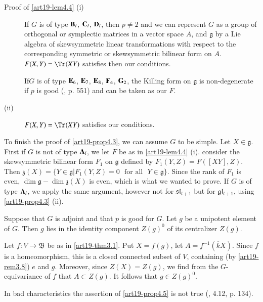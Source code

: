 \begin{description}
\item[Proof of \ref{art19-lem4.4} {\rm (i)}]
If $G$ is of type $\mathbf{B}_{l}$, $\mathbf{C}_{l}$, $\mathbf{D}_{l}$, then $p\neq 2$ and we can represent $G$ as a group of orthogonal or symplectic matrices in a vector space $A$, and $\mathfrak{g}$ by a Lie algebra of skewsymmetric linear transformations with respect to the corresponding symmetric or skewsymmetric bilinear form on $A$. $F(X,Y)=\Tr(XY)$ satisfies then our conditions.

If\pageoriginale $G$ is of type $\mathbf{E}_{6}$, $\mathbf{E}_{7}$, $\mathbf{E}_{8}$, $\mathbf{F}_{4}$, $\mathbf{G}_{2}$, the Killing form on $\mathfrak{g}$ is non-degenerate if $p$ is good (\cite{art19-key12}, p. 551) and can be taken as our $F$.

\item[{\rm(ii)}] $F(X,Y)=\Tr(XY)$ satisfies our conditions.
\end{description}

To finish the proof of \ref{art19-prop4.3}, we can assume $G$ to be simple. Let $X\in \mathfrak{g}$. First if $G$ is not of type $\mathbf{A}_{l}$, we let $F$ be as in \ref{art19-lem4.4} (i). consider the skewsymmetric bilinear form $F_{1}$ on $\mathfrak{g}$ defined by $F_{1}(Y,Z)=F([XY],Z)$. Then $\mathfrak{z}(X)=\{Y\in \mathfrak{g}|F_{1}(Y,Z)=0\text{~ for all~ } Y\in \mathfrak{g}\}$. Since the rank of $F_{1}$ is even, $\dim \mathfrak{g}-\dim \mathfrak{z}(X)$ is even, which is what we wanted to prove. If $G$ is of type $\mathbf{A}_{l}$, we apply the same argument, however not for $\mathfrak{s}\mathfrak{l}_{l+1}$ but for $\mathfrak{g}\mathfrak{l}_{l+1}$, using \ref{art19-prop4.3} (ii).

\begin{proposition}\label{art19-prop4.5}
Suppose that $G$ is adjoint and that $p$ is good for $G$. Let $g$ be a unipotent element of $G$. Then $g$ lies in the identity component $Z(g)^{0}$ of its centralizer $Z(g)$.
\end{proposition}

Let $f:V\to \mathfrak{B}$ be as in \ref{art19-thm3.1}. Put $X=f(g)$, let $A=f^{-1}(\overline{k}X)$. Since $f$ is a homeomorphism, this is a closed connected subset of $V$, containing (by \ref{art19-rem3.8}) $e$ and $g$. Moreover, since $Z(X)=Z(g)$, we find from the $G$-equivariance of $f$ that $A\subset Z(g)$. It follows that $g\in Z(g)^{0}$.

\begin{remark*}
In bad characteristics the assertion of \ref{art19-prop4.5} is not true (\cite{art19-key14}, 4.12, p. 134).
\end{remark*}

